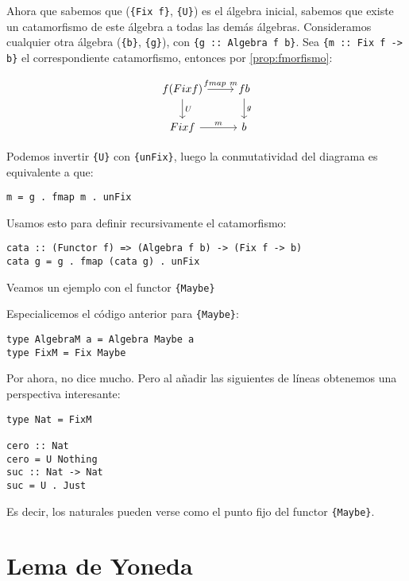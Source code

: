 \documentclass[12pt, twoside]{book}
\newcommand{\code}[1]{\Verb+{#1}+}
\begin{document}
Ahora que sabemos que (\code{Fix f}, \code{U}) es el álgebra inicial, sabemos que existe un catamorfismo de este álgebra a todas las demás álgebras.
Consideramos cualquier otra álgebra (\code{b}, \code{g}), con \code{g :: Algebra f b}. Sea \code{m :: Fix f -> b} el correspondiente catamorfismo, entonces por \ref{prop:fmorfismo}:

\[
\begin{tikzcd}
{f (Fix f)} \arrow[r,"fmap\ m"] \arrow[d,"U"] & f b \arrow[d,"g"]\\
{Fix f} \arrow[r,"m"] & b
\end{tikzcd}
\]

Podemos invertir \code{U} con \code{unFix}, luego la conmutatividad del diagrama es equivalente a que:
\begin{verbatim}
m = g . fmap m . unFix
\end{verbatim}
Usamos esto para definir recursivamente el catamorfismo:
\begin{verbatim}
cata :: (Functor f) => (Algebra f b) -> (Fix f -> b)
cata g = g . fmap (cata g) . unFix
\end{verbatim}

Veamos un ejemplo con el functor \code{Maybe}
\begin{example}
Especialicemos el código anterior para \code{Maybe}:
\begin{verbatim}
type AlgebraM a = Algebra Maybe a
type FixM = Fix Maybe
\end{verbatim}
Por ahora, no dice mucho. Pero al añadir las siguientes de líneas obtenemos una perspectiva interesante:
\begin{verbatim}
type Nat = FixM

cero :: Nat
cero = U Nothing
suc :: Nat -> Nat
suc = U . Just
\end{verbatim}
Es decir, los naturales pueden verse como el punto fijo del functor \code{Maybe}.
\end{example}

\chapter{Lema de Yoneda}
\end{document}
